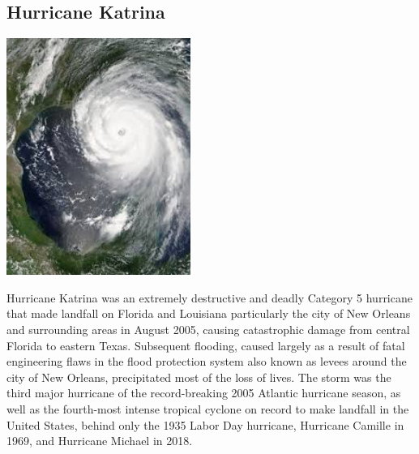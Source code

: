\documentclass[11pt]{report}
\begin{document}
\subsection{Hurricane Katrina}
\vspace{2mm}\begin{center}\includegraphics[width=6cm]{./img/hurricaneKatrina.jpg}\end{center}
Hurricane Katrina was an extremely destructive and deadly Category 5 hurricane that made landfall on Florida and Louisiana particularly the city of New Orleans and surrounding areas in August 2005, causing catastrophic damage from central Florida to eastern Texas. Subsequent flooding, caused largely as a result of fatal engineering flaws in the flood protection system also known as levees around the city of New Orleans, precipitated most of the loss of lives. The storm was the third major hurricane of the record-breaking 2005 Atlantic hurricane season, as well as the fourth-most intense tropical cyclone on record to make landfall in the United States, behind only the 1935 Labor Day hurricane, Hurricane Camille in 1969, and Hurricane Michael in 2018.
\section{}
\end{document}
